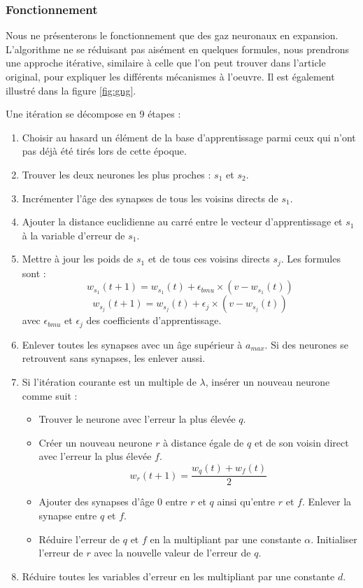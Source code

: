 	\subsubsection{Fonctionnement}

	Nous ne présenterons le fonctionnement que des gaz neuronaux en expansion. L'algorithme ne se réduisant pas aisément en quelques formules, nous prendrons une approche itérative, similaire à celle que l'on peut trouver dans l'article original, pour expliquer les différents mécanismes à l'oeuvre. Il est également illustré dans la figure \ref{fig:gng}.

	Une itération se décompose en 9 étapes :
	\begin{enumerate}
		\item Choisir au hasard un élément de la base d'apprentissage parmi ceux qui n'ont pas déjà été tirés lors de cette époque.
		\item Trouver les deux neurones les plus proches : $s_1$ et $s_2$.
		\item Incrémenter l'âge des synapses de tous les voisins directs de $s_1$.
		\item Ajouter la distance euclidienne au carré entre le vecteur d'apprentissage et $s_1$ à la variable d'erreur de $s_1$.
		\item Mettre à jour les poids de $s_1$ et de tous ces voisins directs $s_j$. Les formules sont :
		\begin{equation}
			w_{s_1}(t+1) = w_{s_1}(t) + \epsilon_{\textit{bmu}} \times (v - w_{s_1}(t))
		\end{equation}
		\begin{equation}
			w_{s_j}(t+1) = w_{s_j}(t) + \epsilon_{j} \times (v - w_{s_j}(t))
		\end{equation}
			avec $\epsilon_{\textit{bmu}}$ et $\epsilon_{j}$ des coefficients d'apprentissage.
		\item Enlever toutes les synapses avec un âge supérieur à $a_{\textit{max}}$. Si des neurones se retrouvent sans synapses, les enlever aussi.
		\item Si l'itération courante est un multiple de $\lambda$, insérer un nouveau neurone comme suit :
		\begin{itemize}
			\item Trouver le neurone avec l'erreur la plus élevée $q$.
			\item Créer un nouveau neurone $r$ à distance égale de $q$ et de son voisin direct avec l'erreur la plus élevée $f$.
			\begin{equation}
				w_r(t+1) = \frac{w_q(t) + w_f(t)}{2}  
			\end{equation}
			\item Ajouter des synapses d'âge 0 entre $r$ et $q$ ainsi qu'entre $r$ et $f$. Enlever la synapse entre $q$ et $f$.
			\item Réduire l'erreur de $q$ et $f$ en la multipliant par une constante $\alpha$. Initialiser l'erreur de $r$ avec la nouvelle valeur de l'erreur de $q$.
		\end{itemize}
		\item Réduire toutes les variables d'erreur en les multipliant par une constante $d$.
	\end{enumerate}

